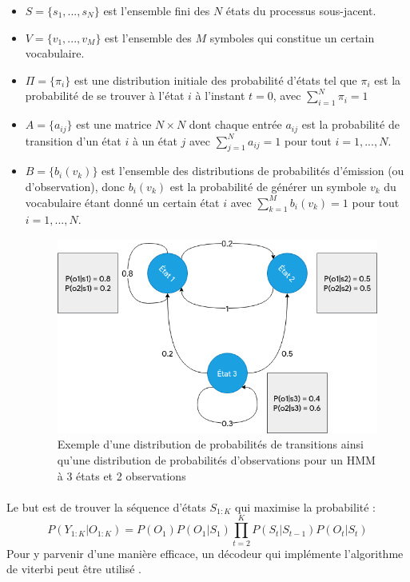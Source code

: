 \begin{itemize}
	\item $S = \lbrace s_1,...,s_N \rbrace$ est l'ensemble fini des $N$ états du processus sous-jacent.
	\item $V = \lbrace v_1,...,v_M \rbrace$ est l'ensemble des $M$ symboles qui constitue un certain vocabulaire.
	\item $\Pi = \lbrace \pi_i \rbrace$ est une distribution initiale des probabilité d'états tel que $\pi_i$ est la probabilité de se trouver à l'état $i$ à l'instant $t=0$, avec $\sum_{i=1}^{N} \pi_i = 1$ 
	\item $A=\lbrace a_{ij} \rbrace$ est une matrice $N \times N$ dont chaque entrée $a_{ij}$ est la probabilité de transition d'un état $i$ à un état $j$ avec $\sum_{j=1}^{N} a_{ij} = 1$ pour tout $i = 1,...,N$.
	\item $B=\lbrace b_i(v_k)\rbrace$ est l'ensemble des distributions de probabilités d'émission (ou d'observation), donc $b_i(v_k)$ est la probabilité de générer un symbole $v_k$ du vocabulaire étant donné un certain état $i$ avec $\sum_{k=1}^{M} b_{i}(v_k) = 1$ pour tout $i= 1,...,N$. 
	
	\begin{figure}[H]
		\centering
		\includegraphics[width=0.65\linewidth]{images/notions/hmm.png}
		\caption{Exemple d'une distribution de probabilités de transitions ainsi qu'une distribution de probabilités d'observations pour un HMM à 3 états et 2 observations}
		\label{hmm_process}
	\end{figure}
\end{itemize}
\paragraph{}
Le but est de trouver la séquence d'états $S_{1:K}$ qui maximise la probabilité \citep{hmm_intro} : 
\begin{equation}
P(Y_{1:K} | O_{1:K}) = P(O_1)P(O_1|S_1)\prod_{t=2}^{K}P(S_t|S_{t-1})P(O_t|S_t) 
\end{equation}
Pour y parvenir d'une manière efficace, un décodeur qui implémente l'algorithme de viterbi peut être utilisé \citep{viterbi,viterbi_hmm}.

